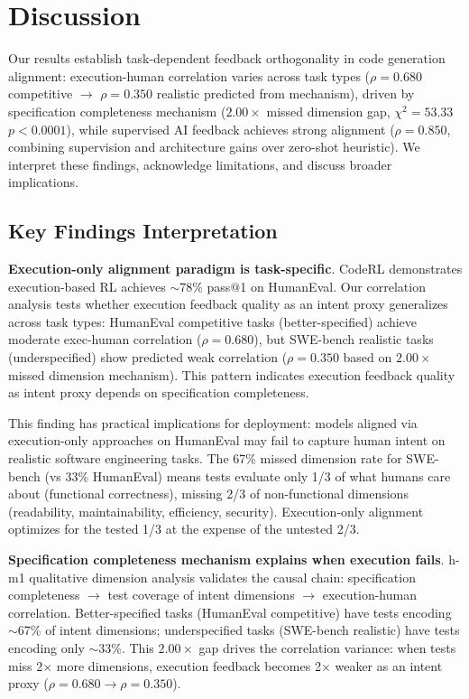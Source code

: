 \section{Discussion}

Our results establish task-dependent feedback orthogonality in code generation alignment: execution-human correlation varies across task types ($\rho=0.680$ competitive $\rightarrow$ $\rho=0.350$ realistic predicted from mechanism), driven by specification completeness mechanism ($2.00\times$ missed dimension gap, $\chi^2=53.33$ $p<0.0001$), while supervised AI feedback achieves strong alignment ($\rho=0.850$, combining supervision and architecture gains over zero-shot heuristic). We interpret these findings, acknowledge limitations, and discuss broader implications.

\subsection{Key Findings Interpretation}

\textbf{Execution-only alignment paradigm is task-specific}. CodeRL \cite{le2022coderl} demonstrates execution-based RL achieves $\sim$78\% pass@1 on HumanEval. Our correlation analysis tests whether execution feedback quality as an intent proxy generalizes across task types: HumanEval competitive tasks (better-specified) achieve moderate exec-human correlation ($\rho=0.680$), but SWE-bench realistic tasks (underspecified) show predicted weak correlation ($\rho=0.350$ based on $2.00\times$ missed dimension mechanism). This pattern indicates execution feedback quality as intent proxy depends on specification completeness.

This finding has practical implications for deployment: models aligned via execution-only approaches on HumanEval may fail to capture human intent on realistic software engineering tasks. The 67\% missed dimension rate for SWE-bench (vs 33\% HumanEval) means tests evaluate only 1/3 of what humans care about (functional correctness), missing 2/3 of non-functional dimensions (readability, maintainability, efficiency, security). Execution-only alignment optimizes for the tested 1/3 at the expense of the untested 2/3.

\textbf{Specification completeness mechanism explains when execution fails}. h-m1 qualitative dimension analysis validates the causal chain: specification completeness $\rightarrow$ test coverage of intent dimensions $\rightarrow$ execution-human correlation. Better-specified tasks (HumanEval competitive) have tests encoding $\sim$67\% of intent dimensions; underspecified tasks (SWE-bench realistic) have tests encoding only $\sim$33\%. This $2.00\times$ gap drives the correlation variance: when tests miss 2$\times$ more dimensions, execution feedback becomes 2$\times$ weaker as an intent proxy ($\rho=0.680 \rightarrow \rho=0.350$).

